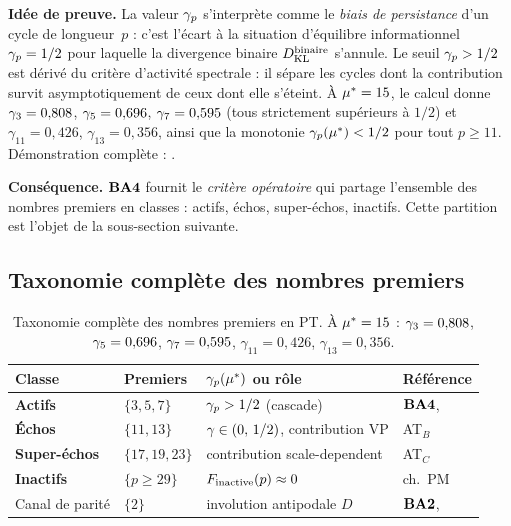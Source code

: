 \textbf{Idée de preuve.} La valeur $\gamma_{p}$ s'interprète comme le \emph{biais de persistance} d'un cycle de longueur~$p$ : c'est l'écart à la situation d'équilibre informationnel $\gamma_{p} = 1/2$ pour laquelle la divergence binaire $D_{\rm KL}^{\rm binaire}$ s'annule. Le seuil $\gamma_{p} > 1/2$ est dérivé du critère d'activité spectrale : il sépare les cycles dont la contribution survit asymptotiquement de ceux dont elle s'éteint. À $\mu^{*} = 15$, le calcul donne $\gamma_{3} = 0{,}808$, $\gamma_{5} = 0{,}696$, $\gamma_{7} = 0{,}595$ (tous strictement supérieurs à $1/2$) et $\gamma_{11} = 0{,}426$, $\gamma_{13} = 0{,}356$, ainsi que la monotonie $\gamma_{p}(\mu^{*}) < 1/2$ pour tout $p \geq 11$. Démonstration complète : \cite[ch.~06]{PT_Monograph}.

\textbf{Conséquence.} $\textbf{BA4}$ fournit le \emph{critère opératoire} qui partage l'ensemble des nombres premiers en classes : actifs, échos, super-échos, inactifs. Cette partition est l'objet de la sous-section suivante.

\subsection{Taxonomie complète des nombres premiers}
\label{sec:bridge:taxonomie}

\begin{table}[htbp]
\centering
\small
\begin{tabular}{@{}llll@{}}
\toprule
Classe & Premiers & $\gamma_{p}(\mu^{*})$ ou rôle & Référence \\
\midrule
\textbf{Actifs} & $\{3, 5, 7\}$ & $\gamma_{p} > 1/2$ (cascade) & $\textbf{BA4}$, \Tfive{} \\
\textbf{Échos} & $\{11, 13\}$ & $\gamma_{} \in (0,\, 1/2)$, contribution VP & AT$_B$~\cite[ch.~PM]{PT_Monograph} \\
\textbf{Super-échos} & $\{17, 19, 23\}$ & contribution scale-dependent & AT$_C$~\cite[ch.~PM]{PT_Monograph} \\
\textbf{Inactifs} & $\{p \geq 29\}$ & $F_{\rm inactive}(p) \approx 0$ & ch.~PM \\
Canal de parité & $\{2\}$ & involution antipodale $D$ & $\textbf{BA2}$, \Tthree{} \\
\bottomrule
\end{tabular}
\caption{Taxonomie complète des nombres premiers en PT. À $\mu^{*} = 15$ : $\gamma_{3} = 0{,}808$, $\gamma_{5} = 0{,}696$, $\gamma_{7} = 0{,}595$, $\gamma_{11} = 0{,}426$, $\gamma_{13} = 0{,}356$.}
\label{tab:taxonomie}
\end{table}

